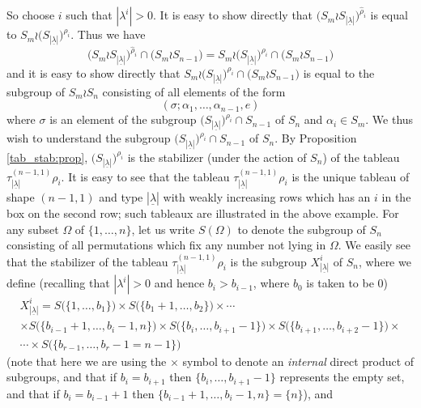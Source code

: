 \documentclass[10pt]{article}
\theoremstyle{definition}
\newcommand{\ul}[1]{\underline{#1}}
\begin{document}
So choose $i$ such that $|\lambda^i|>0$.
It is easy to show directly that $\bigl(S_m \wr S_{|\ul{\lambda}|}\bigr)^{\hat\rho_i}$ is equal to
$S_m \wr \bigl(S_{|\ul{\lambda}|}\bigr)^{\rho_i}$. Thus we have
\[\bigl(S_m \wr S_{|\ul{\lambda}|}\bigr)^{\hat\rho_i}\cap\bigl(S_m \wr S_{n-1}\bigr)
=
S_m \wr \bigl(S_{|\ul{\lambda}|}\bigr)^{\rho_i}\cap\bigl(S_m \wr S_{n-1}\bigr)\]
and it is easy to show directly that $S_m \wr \bigl(S_{|\ul{\lambda}|}\bigr)^{\rho_i}\cap\bigl(S_m \wr S_{n-1}\bigr)$
is equal to the subgroup of $S_m \wr S_n$ consisting of all elements of the form
\begin{equation}\label{elt_of_conj_intersect:eq}
(\sigma; \alpha_1,\ldots,\alpha_{n-1},e)
\end{equation}
where $\sigma$ is an element of the subgroup
$\bigl(S_{|\ul{\lambda}|}\bigr)^{\rho_i}\cap S_{n-1}$ of $S_n$
and $\alpha_i \in S_m$. We thus wish to understand the subgroup $\bigl(S_{|\ul{\lambda}|}\bigr)^{\rho_i}\cap S_{n-1}$ of $S_n$.
By Proposition \ref{tab_stab:prop}, $\bigl(S_{|\ul{\lambda}|}\bigr)^{\rho_i}$ is the stabilizer (under
the action of $S_n$) of the tableau $\tau^{(n-1,1)}_{|\ul{\lambda}|}\rho_i$. It is easy to see that the tableau
$\tau^{(n-1,1)}_{|\ul{\lambda}|}\rho_i$ is the unique tableau of shape $(n-1,1)$ and type $|\ul{\lambda}|$ with weakly increasing rows which
has an $i$ in the box on the second row; such tableaux are illustrated in the above example. For any subset $\Omega$ of $\{1,\ldots,n\}$,
let us write $S(\Omega)$ to denote the subgroup of
$S_n$ consisting of all permutations which fix any number not lying in $\Omega$. We easily see that the stabilizer of the tableau
$\tau^{(n-1,1)}_{|\ul{\lambda}|}\rho_i$ is the subgroup $X^i_{|\ul{\lambda}|}$ of $S_n$, where we define (recalling that $|\lambda^i|>0$ and hence
$b_i > b_{i-1}$, where $b_0$ is taken to be 0)
\begin{multline*}
X^i_{|\ul{\lambda}|} = S\bigl(\{1,\ldots,b_1\}\bigr) \times S\bigl(\{b_1+1,\ldots,b_2\}\bigr) \times \cdots\\
\times S\bigl(\{b_{i-1}+1,\ldots,b_i-1,n\}\bigr)\times
S\bigl(\{b_i,\ldots,b_{i+1}-1\}\bigr)\times S\bigl(\{b_{i+1},\ldots,b_{i+2}-1\}\bigr)\times\\
\cdots \times S\bigl(\{b_{r-1},\ldots,b_r-1 =n-1\}\bigr)
\end{multline*}
(note that here we are using the $\times$ symbol to denote an \textit{internal} direct product of subgroups, and that if $b_i = b_{i+1}$
then $\{b_i,\ldots,b_{i+1}-1\}$ represents the empty set, and that if $b_i = b_{i-1}+1$ then $\{b_{i-1}+1,\ldots,b_i-1,n\} = \{n\}$), and
\end{document}
